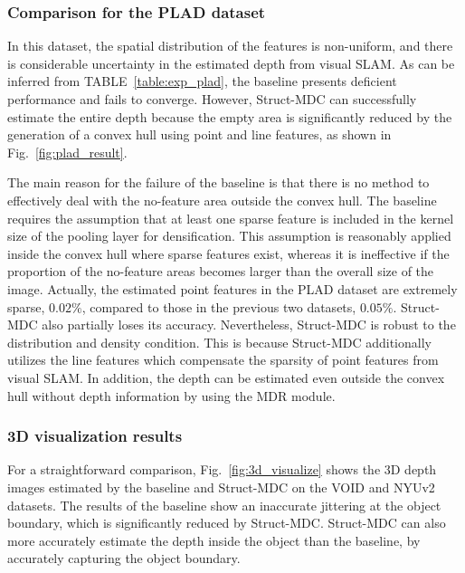 \subsubsection{Comparison for the PLAD dataset}
In this dataset, the spatial distribution of the features is non-uniform, and there is \textcolor{color1}{considerable} uncertainty in the estimated depth from visual SLAM. 
As \textcolor{color1}{can be inferred from} TABLE~\ref{table:exp_plad}, the baseline \textcolor{color1}{presents} deficient performance and fail\textcolor{color1}{s} to converge. \textcolor{color1}{However}, Struct-MDC \textcolor{color1}{can} successfully estimate the entire depth \textcolor{color1}{because} the empty area \textcolor{color1}{is} significantly reduced by \textcolor{color1}{the generation of}  a convex hull using point and line features, as shown in  Fig.~\ref{fig:plad_result}. 

The main reason \textcolor{color1}{for the failure of} the baseline is that there is no \textcolor{color1}{method} to effectively \textcolor{color1}{deal with} the no-feature area outside the convex hull. The baseline requires the assumption that at least one sparse feature \textcolor{color1}{is} included in the kernel size of the pooling layer for \textcolor{color1}{densification}. This assumption is reasonably applied inside the convex hull where sparse features exist, \textcolor{color1}{whereas} it is \textcolor{color1}{in}effective if the proportion of the no-feature areas becomes large\textcolor{color1}{r than} the overall size of the image. Actually, the estimated point features \textcolor{color1}{in the} PLAD \textcolor{color1}{dataset} are extremely sparse, $0.02\%$, compared to \textcolor{color1}{those in} the previous two datasets, $0.05\%$. 
Struct-MDC also \textcolor{color1}{partially loses its} accuracy. Nevertheless, Struct-MDC is robust to the distribution and density condition.
This is because Struct-MDC additionally utilizes the line features which compensate the sparsity of point features from visual SLAM.  
In addition, the depth can be estimated even outside the convex hull without depth information by using the MDR module. 



\subsubsection{3D visualization results}
For a straightforward comparison, Fig.~\ref{fig:3d_visualize} \textcolor{color1}{shows} the 3D depth images estimated by the baseline and Struct-MDC \textcolor{color1}{on the} VOID and NYUv2 \textcolor{color1}{datasets}. 
The \textcolor{color1}{results of} the baseline \textcolor{color1}{show an} inaccurate jittering at the object boundary, \textcolor{color1}{which} is significantly reduced \textcolor{color1}{by} Struct-MDC. 
Struct-MDC can also more accurately estimate the depth inside the object than the baseline, by accurately \textcolor{color1}{capturing} the object boundary. 


